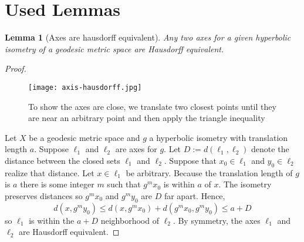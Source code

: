 \documentclass{article}
\theoremstyle{mystyle}
\newtheorem{lem}[thm]{Lemma}
\theoremstyle{remark}
\begin{document}
\section{Used Lemmas}

\begin{lem}
    [Axes are hausdorff equivalent]
    \label{lem:axeshausdorff}
    Any two axes for a given hyperbolic isometry of a geodesic metric space are Hausdorff equivalent.
    
\end{lem}
\begin{proof}

\begin{figure}[htp]
    \centering
    \texttt{[image: axis-hausdorff.jpg]}
    \caption{To show the axes are close, we translate two closest points until they are near an arbitrary point and then apply the triangle inequality}
    \label{fig:axis-hausdorff}
\end{figure}

    Let $X$ be a geodesic metric space and $g$ a hyperbolic isometry with translation length $a$. Suppose $\ell_1$ and $\ell_2$ are axes for $g$. Let $D:= d(\ell_1,\ell_2)$ denote the distance between the closed sets $\ell_1$ and $\ell_2$. Suppose that $x_0\in\ell_1$ and $y_0\in\ell_2$ realize that distance. Let $x\in\ell_1$ be arbitrary. Because the translation length of $g$ is $a$ there is some integer $m$ such that $g^mx_0$ is within $a$ of $x$. The isometry preserves distances so $g^mx_0$ and $g^my_0$ are $D$ far apart. Hence, $$d(x, g^my_0)\leq d(x, g^mx_0) + d(g^mx_0, g^my_0)\leq a+D$$ so $\ell_1$ is within the $a+D$ neighborhood of $\ell_2$. By symmetry, the axes $\ell_1$ and $\ell_2$ are Hausdorff equivalent.
\end{proof}
\end{document}
